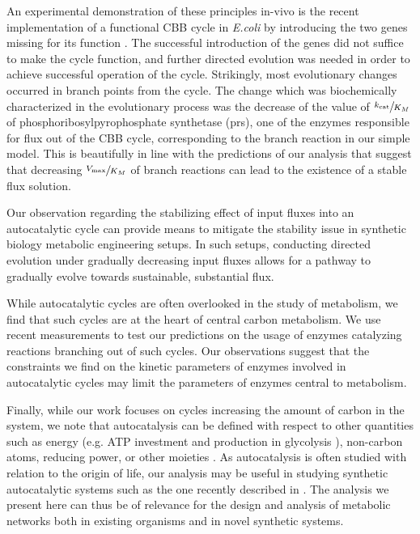 An experimental demonstration of these principles in-vivo is the recent implementation of a functional CBB cycle in \emph{E.coli} by introducing the two genes missing for its function \cite{Antonovsky2016-jy}.
The successful introduction of the genes did not suffice to make the cycle function, and further directed evolution was needed in order to achieve successful operation of the cycle.
Strikingly, most evolutionary changes occurred in branch points from the cycle.
The change which was biochemically characterized in the evolutionary process was the decrease of the value of $\sfrac{k_{\text{cat}}}{K_M}$ of phosphoribosylpyrophosphate synthetase (prs), one of the enzymes responsible for flux out of the CBB cycle, corresponding to the branch reaction in our simple model.
This is beautifully in line with the predictions of our analysis that suggest that decreasing $\sfrac{V_{\max}}{K_M}$ of branch reactions can lead to the existence of a stable flux solution.

Our observation regarding the stabilizing effect of input fluxes into an autocatalytic cycle can provide means to mitigate the stability issue in synthetic biology metabolic engineering setups.
In such setups, conducting directed evolution under gradually decreasing input fluxes allows for a pathway to gradually evolve towards sustainable, substantial flux.

While autocatalytic cycles are often overlooked in the study of metabolism, we find that such cycles are at the heart of central carbon metabolism.
We use recent measurements to test our predictions on the usage of enzymes catalyzing reactions branching out of such cycles.
Our observations suggest that the constraints we find on the kinetic parameters of enzymes involved in autocatalytic cycles may limit the parameters of enzymes central to metabolism.

Finally, while our work focuses on cycles increasing the amount of carbon in the system, we note that autocatalysis can be defined with respect to other quantities such as energy (e.g. ATP investment and production in glycolysis \cite{Teusink1998-he}), non-carbon atoms, reducing power, or other moieties \cite{Reich1981-qd}.
  As autocatalysis is often studied with relation to the origin of life, our analysis may be useful in studying synthetic autocatalytic systems such as the one recently described in \cite{Semenov2016-ol}.
  The analysis we present here can thus be of relevance for the design and analysis of metabolic networks both in existing organisms and in novel synthetic systems.

